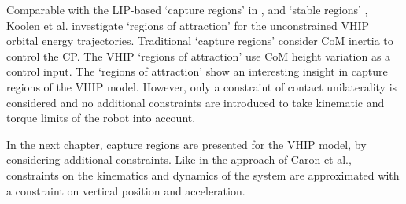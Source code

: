 Comparable with the \ac{LIP}-based `capture regions' in \cite{pratt2006capture}, \cite{koolen2012capturability} and `stable regions' \cite{stephens2007humanoid},  Koolen et al. investigate `regions of attraction' for the unconstrained \ac{VHIP} orbital energy trajectories. Traditional `capture regions' consider \ac{CoM} inertia to control the \ac{CP}. The \ac{VHIP} `regions of attraction' use \ac{CoM} height variation as a control input. The `regions of attraction' show an interesting insight in capture regions of the \ac{VHIP} model. However, only a constraint of contact unilaterality is considered and no additional constraints are introduced to take kinematic and torque limits of the robot into account. 

In the next chapter, capture regions are presented for the \ac{VHIP} model, by considering additional constraints. Like in the approach of Caron et al., constraints on the kinematics and dynamics of the system are approximated with a constraint on vertical position and acceleration.